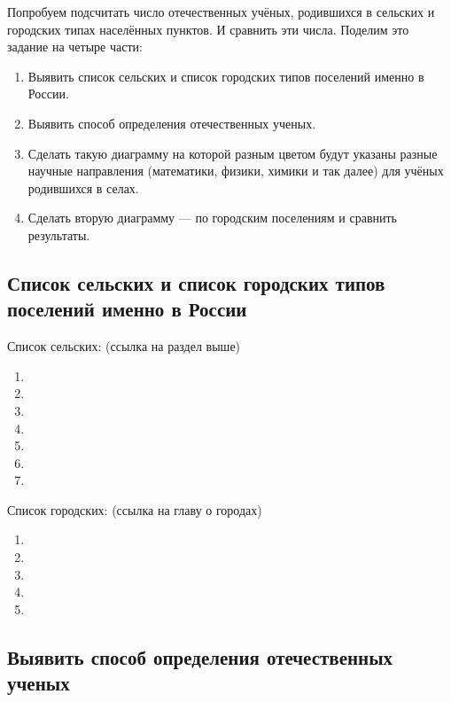 Попробуем подсчитать число отечественных учёных, родившихся в сельских и городских типах населённых пунктов. И сравнить эти числа.
Поделим это задание на четыре части:
\begin{enumerate}
  \item Выявить список сельских и список городских типов поселений именно в России.
  \item Выявить способ определения отечественных ученых.
  \item Сделать такую диаграмму на которой разным цветом будут указаны разные научные направления (математики, физики, химики и так далее) для учёных родившихся в селах.
  \item Сделать вторую диаграмму — по городским поселениям и сравнить результаты.
\end{enumerate}

\subsection{Список сельских и список городских типов поселений именно в России}

Список сельских: (ссылка на раздел выше)

\begin{enumerate}
  \item {}
  \item {}
  \item {}
  \item {}
  \item {}
  \item {}
  \item {}
\end{enumerate}

Список городских: (ссылка на главу о городах) 
\begin{enumerate}
  \item {}
  \item {}
  \item {}
  \item {}
  \item {}
\end{enumerate}
\subsection{Выявить способ определения отечественных ученых}

